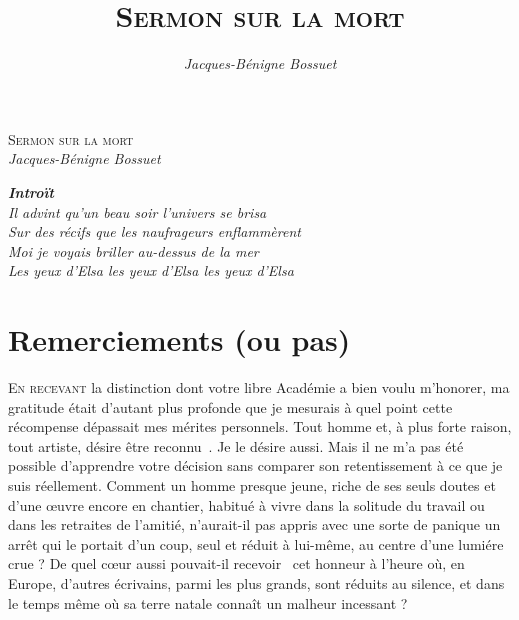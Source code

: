 \documentclass[a4paper,footinbib,final,openany,final,12pt]{book}
\author{\textsl{Jacques-B{\'{e}}nigne Bossuet}}
\title{\textsc{Sermon sur la mort}}
\begin{document}
\renewcommand{\thepart}{}
\renewcommand{\partname}{}
\renewcommand{\thechapter}{}
\renewcommand{\chaptername}{}
\renewcommand{\thesection}{}

\thispagestyle{empty}
\vspace*{18ex}
\begin{center}
\fontsize{100pt}{100pt}\selectfont
\textsc{Sermon sur la mort}\\
\vspace{3ex}
\fontsize{25pt}{25pt}\selectfont
\emph{{Jacques-B{\'{e}}nigne Bossuet}}
\end{center}
\newpage
\strut
\newpage

\vspace*{50ex}
\begin{flushright}
\emph{\textbf{\large{Intro\"{i}t}}}\\
\vspace*{2ex}
\large{\emph{{\normalsize{Il advint qu'un beau soir l'univers se brisa\\Sur des r{\'{e}}cifs que les naufrageurs enflamm{\`{e}}rent\\Moi je voyais briller au-dessus de la mer\\Les yeux d'Elsa les yeux d'Elsa les yeux d'Elsa }}}}
\end{flushright}
\newpage
\strut
\newpage
\tableofcontents
\newpage
\strut
\newpage

\section{Remerciements (ou pas)}

\lettrine{E}{n recevant} la distinction dont votre libre Acad{\'{e}}mie a bien voulu m'honorer, ma gratitude {\'{e}}tait d'autant plus profonde que je mesurais {\`{a}} quel point cette r{\'{e}}compense d{\'{e}}passait mes m{\'{e}}rites personnels. Tout homme et, {\`{a}} plus forte raison, tout artiste, d{\'{e}}sire {\^{e}}tre reconnu~\cite{Noyau}. Je le d{\'{e}}sire aussi. Mais il ne m'a pas {\'{e}}t{\'{e}} possible d'apprendre votre d{\'{e}}cision sans comparer son retentissement {\`{a}} ce que je suis r{\'{e}}ellement. Comment un homme presque jeune, riche de ses seuls doutes et d'une {\oe}uvre encore en chantier, habitu{\'{e}} {\`{a}} vivre dans la solitude du travail ou dans les retraites de l'amiti{\'{e}}, n'aurait-il pas appris avec une sorte de panique un arr{\^{e}}t qui le portait d'un coup, seul et r{\'{e}}duit {\`{a}} lui-m{\^{e}}me, au centre d'une lumi{\'{e}}re crue ? De quel c{\oe}ur aussi pouvait-il recevoir~\cite{Fondement} cet honneur {\`{a}} l'heure o{\`{u}}, en Europe, d'autres {\'{e}}crivains, parmi les plus grands, sont r{\'{e}}duits au silence, et dans le temps m{\^{e}}me o{\`{u}} sa terre natale conna{\^{i}}t un malheur incessant ?
\newpage
\strut
\newpage
\end{document}
